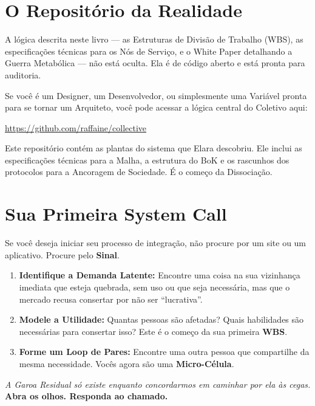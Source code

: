 \section*{O Repositório da Realidade}
A lógica descrita neste livro --- as Estruturas de Divisão de Trabalho (WBS), as especificações técnicas para os Nós de Serviço, e o White Paper detalhando a Guerra Metabólica --- não está oculta. Ela é de código aberto e está pronta para auditoria.

Se você é um Designer, um Desenvolvedor, ou simplesmente uma Variável pronta para se tornar um Arquiteto, você pode acessar a lógica central do Coletivo aqui:

\begin{center}
    \headerfont\color{collectiveBlue} \url{https://github.com/raffaine/collective}
\end{center}

Este repositório contém as plantas do sistema que Elara descobriu. Ele inclui as especificações técnicas para a Malha, a estrutura do BoK e os rascunhos dos protocolos para a Ancoragem de Sociedade. É o começo da Dissociação.

\section*{Sua Primeira System Call}
Se você deseja iniciar seu processo de integração, não procure por um site ou um aplicativo. Procure pelo \textbf{Sinal}.
\begin{enumerate}
    \item \textbf{Identifique a Demanda Latente:} Encontre uma coisa na sua vizinhança imediata que esteja quebrada, sem uso ou que seja necessária, mas que o mercado recusa consertar por não ser ``lucrativa''.
    \item \textbf{Modele a Utilidade:} Quantas pessoas são afetadas? Quais habilidades são necessárias para consertar isso? Este é o começo da sua primeira \textbf{WBS}.
    \item \textbf{Forme um Loop de Pares:} Encontre uma outra pessoa que compartilhe da mesma necessidade. Vocês agora são uma \textbf{Micro-Célula}.
\end{enumerate}

\begin{center}
    \textit{A Garoa Residual só existe enquanto concordarmos em caminhar por ela às cegas.} \\
    \textbf{Abra os olhos. Responda ao chamado.}
\end{center}
